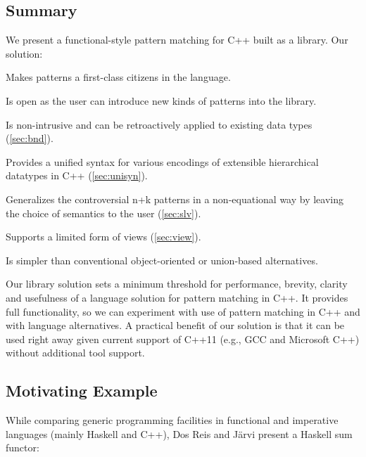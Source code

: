 \subsection{Summary}

We present a functional-style pattern matching for C++ built as a library. Our solution:

\begin{compactitem}
\setlength{\itemsep}{0pt}
\setlength{\parskip}{0pt}
  \item Makes patterns a first-class citizens in the language.
  \item Is open as the user can introduce new kinds of patterns into the library.
  \item Is non-intrusive and can be retroactively applied to existing data types (\textsection\ref{sec:bnd}).
  \item Provides a unified syntax for various encodings of extensible 
        hierarchical datatypes in C++ (\textsection\ref{sec:unisyn}).
  \item Generalizes the controversial n+k patterns in a non-equational way by 
        leaving the choice of semantics to the user (\textsection\ref{sec:slv}). 
  \item Supports a limited form of views (\textsection\ref{sec:view}).
  \item Is simpler than conventional object-oriented or union-based alternatives.
\end{compactitem}

\noindent
Our library solution sets a minimum threshold for performance, brevity, clarity 
and usefulness of a language solution for pattern matching in C++. It provides 
full functionality, so we can experiment with use of pattern matching in C++ and 
with language alternatives. A practical benefit of our solution is that it can 
be used right away given current support of C++11 (e.g., GCC and Microsoft C++)  
without additional tool support.

\subsection{Motivating Example}
\label{sec:xmpl}

While comparing generic programming facilities in functional and 
imperative languages (mainly Haskell and C++), Dos Reis and J\"arvi
present a Haskell sum functor\cite{DRJ05}:

